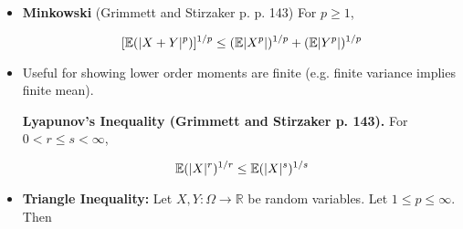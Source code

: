 \begin{itemize}
\begin{itemize}
\begin{proof} Assume without loss of generality that \(\lVert X\rVert_p = \lVert Y \rVert_q = 1\). Also, the case \(p=1, q=\infty\) follows from the triangle inequality, so we assume \(1 < p < \infty\). From concavity of the log function, we have

\[
\log\big((x^p)^{1/p}(y^q)^{1/q} \big) = (1/p) \log \big( x^p\big) + (1/q) \log \big(y^q\big)
\]

\[
 \leq \log \bigg( \frac{1}{p} x^p + \frac{1}{q} y^q\bigg) 
 \]
 
 \[
 \implies (x^p)^{1/p}(y^q)^{1/q} \leq \frac{1}{p} x^p + \frac{1}{q} y^q
 \]
 
 Fixing an \(\omega \in \Omega\), we have
 
 \[
|X(\omega) Y(\omega)| =  (|X(\omega)|^p)^{1/p}(|Y(\omega)|^q)^{1/q} \leq \frac{1}{p}  |X(\omega)|^p + \frac{1}{q}  |Y(\omega)|^q
 \]
 
Integrating we have...
 
\end{proof}

\begin{theorem} For any \(u, v \in \mathbb{R}^n\),

\[
| u^T v | \leq \lVert u \rVert_p \lVert v \rVert_q
\]
for any \(p, q \in [0, \infty]\) satisfying \(1/p + 1/q = 1\).

\end{theorem}

\item \begin{theorem} \textbf{Minkowski} (Grimmett and Stirzaker p. p. 143) For \(p \geq 1\),

\[
[\mathbb{E}(|X + Y|^p)]^{1/p} \leq (\mathbb{E}|X^p|)^{1/p} + (\mathbb{E}|Y^p|)^{1/p}
\]
\end{theorem}

\item Useful for showing lower order moments are finite (e.g. finite variance implies finite mean). \begin{lemma}\textbf{Lyapunov's Inequality (Grimmett and Stirzaker p. 143).}\label{asym.lyapunov} For \(0 < r \leq s < \infty\),

\[
\mathbb{E}(|X|^r)^{1/r} \leq \mathbb{E}(|X|^s)^{1/s} 
\]
\end{lemma}

\item \begin{theorem}\label{asym.tri.ineq.norm} \textbf{Triangle Inequality:} Let \(X, Y: \Omega \to \mathbb{R}\) be random variables. Let \(1 \leq p \leq \infty\). Then


\end{theorem}
\end{itemize}
\end{itemize}

